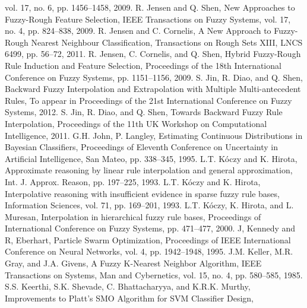 vol. 17, no. 6, pp. 1456--1458,
2009.
R. Jensen and Q. Shen,
New Approaches to Fuzzy-Rough Feature Selection,
IEEE Transactions on Fuzzy Systems,
vol. 17, no. 4, pp. 824--838,
2009.
R. Jensen and C. Cornelis,
A New Approach to Fuzzy-Rough Nearest Neighbour Classification,
Transactions on Rough Sets XIII,
LNCS 6499, pp. 56--72,
2011.
R. Jensen, C. Cornelis, and Q. Shen,
Hybrid Fuzzy-Rough Rule Induction and Feature Selection,
Proceedings of the 18th International Conference on Fuzzy Systems,
pp. 1151--1156,
2009.
S. Jin, R. Diao, and Q. Shen,
Backward Fuzzy Interpolation and Extrapolation with Multiple Multi-antecedent Rules,
To appear in Proceedings of the 21st International Conference on Fuzzy Systems,
2012.
S. Jin, R. Diao, and Q. Shen,
Towards Backward Fuzzy Rule Interpolation,
Proceedings of the 11th UK Workshop on Computational Intelligence,
2011.
G.H. John, P. Langley,
Estimating Continuous Distributions in Bayesian Classifiers,
Proceedings of Eleventh Conference on Uncertainty in Artificial Intelligence, San Mateo,
pp. 338--345,
1995.
L.T. K\'{o}czy and K. Hirota,
Approximate reasoning by linear rule interpolation and general approximation,
Int. J. Approx. Reason,
pp. 197--225,
1993.
L.T. K\'{o}czy and K. Hirota,
Interpolative reasoning with insufficient evidence in sparse fuzzy rule bases,
Information Sciences,
vol. 71, pp. 169--201,
1993.
L.T. K\'{o}czy, K. Hirota, and L. Muresan,
Interpolation in hierarchical fuzzy rule bases,
Proceedings of International Conference on Fuzzy Systems,
pp. 471--477,
2000.
J, Kennedy and R, Eberhart,
Particle Swarm Optimization,
Proceedings of IEEE International Conference on Neural Networks,
vol. 4, pp. 1942--1948,
1995.
J.M. Keller, M.R. Gray, and J.A. Givens,
A Fuzzy K-Nearest Neighbor Algorithm,
IEEE Transactions on Systems, Man and Cybernetics,
vol. 15, no. 4, pp. 580--585,
1985.
S.S. Keerthi, S.K. Shevade, C. Bhattacharyya, and K.R.K. Murthy,
Improvements to Platt's SMO Algorithm for SVM Classifier Design,

